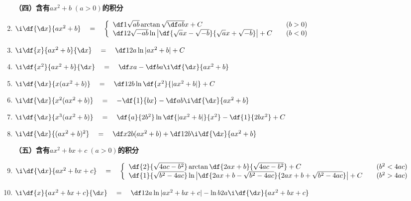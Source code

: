 \begin{enumerate}
\bigskip
{\bf （四）含有$ax^2+b\;(a>0)$的积分}\bigskip
  \item $\i\df{{\d x}}{ax^2+b}\quad=\quad\left\{\begin{array}{ll}
  \df 1{\sqrt{ab}}\arctan\sqrt{\df ab}x+C & \quad (b>0)\\
  \df 1{2\sqrt{-ab}}\ln\left|\df{\sqrt ax-\sqrt{-b}}{\sqrt
  ax+\sqrt{-b}}\right|+C & \quad (b<0) \end{array}\right.$
  \item $\i\df{x}{ax^2+b}{\d x}\quad=\quad \df 1{2a}\ln|ax^2+b|+C$
  \item $\i\df{x^2}{ax^2+b}{\d x} \quad=\quad \df xa -\df ba\i\df{{\d x}}{ax^2+b}$
  \item $\i\df{{\d x}}{x(ax^2+b)}\quad=\quad \df 1{2b}\ln\df{x^2}{|ax^2+b|}+C$
  \item $\i\df{{\d x}}{x^2(ax^2+b)}\quad=\quad-\df{1}{bx}-\df ab\i\df{{\d x}}{ax^2+b}$
  \item $\i\df{{\d x}}{x^3(ax^2+b)}\quad=\quad
  \df{a}{2b^2}\ln\df{|ax^2+b|}{x^2}-\df{1}{2bx^2}+C$
  \item $\i\df{{\d x}}{(ax^2+b)^2}\quad=\quad\df x{2b(ax^2+b)}+\df
  1{2b}\i\df{{\d x}}{ax^2+b}$

\bigskip
{\bf （五）含有$ax^2+bx+c\;(a>0)$的积分}
  \item $\i\df{{\d x}}{ax^2+bx+c}\quad=\quad\left\{\begin{array}{ll}
  \df{2}{\sqrt{4ac-b^2}}\arctan\df{2ax+b}{\sqrt{4ac-b^2}}+C & \quad (b^2<4ac)\\
  \df{1}{\sqrt{b^2-4ac}}\ln\left|
  \df{2ax+b-\sqrt{b^2-4ac}}{2ax+b+\sqrt{b^2-4ac}}
  \right|+C & \quad (b^2>4ac)
  \end{array}\right.$
  \item $\i\df{x}{ax^2+bx+c}{\d x}\quad=\quad\df 1{2a}\ln|ax^2+bx+c|-\ln
  b{2a}\i\df{{\d x}}{ax^2+bx+c}$


\end{enumerate}
